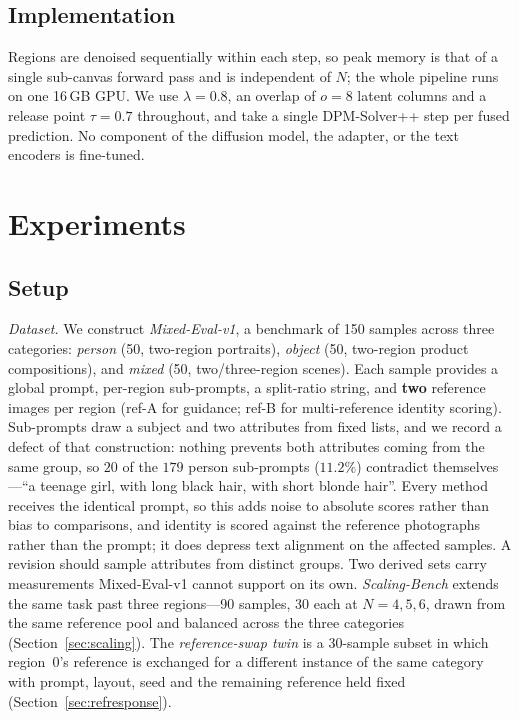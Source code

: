\documentclass[10pt,twocolumn,letterpaper]{article}
\begin{document}
\subsection{Implementation}
\label{sec:method_impl}

Regions are denoised sequentially within each step, so peak memory is
that of a single sub-canvas forward pass and is independent of $N$;
the whole pipeline runs on one 16\,GB GPU.  We use $\lambda=0.8$, an
overlap of $o=8$ latent columns and a release point $\tau=0.7$
throughout, and take a single DPM-Solver++ step per fused prediction.
No component of the diffusion model, the adapter, or the text encoders
is fine-tuned.

\section{Experiments}
\label{sec:exp}

\subsection{Setup}

\noindent\textit{Dataset.}
We construct \emph{Mixed-Eval-v1}, a benchmark of 150 samples across
three categories: \emph{person} (50, two-region portraits),
\emph{object} (50, two-region product compositions), and \emph{mixed}
(50, two/three-region scenes).  Each sample provides a global prompt,
per-region sub-prompts, a split-ratio string, and \textbf{two}
reference images per region (ref-A for guidance; ref-B for
multi-reference identity scoring).
Sub-prompts draw a subject and two attributes from fixed lists, and we record
a defect of that construction: nothing prevents both attributes coming from
the same group, so $20$ of the $179$ person sub-prompts ($11.2\%$) contradict
themselves---``a teenage girl, with long black hair, with short blonde hair''.
Every method receives the identical prompt, so this adds noise to absolute
scores rather than bias to comparisons, and identity is scored against the
reference photographs rather than the prompt; it does depress text alignment
on the affected samples.  A revision should sample attributes from distinct
groups.
Two derived sets carry measurements Mixed-Eval-v1 cannot support on its own.
\emph{Scaling-Bench} extends the same task past three regions---90 samples,
30 each at $N{=}4,5,6$, drawn from the same reference pool and balanced
across the three categories (Section~\ref{sec:scaling}).  The
\emph{reference-swap twin} is a 30-sample subset in which region~0's
reference is exchanged for a different instance of the same category with
prompt, layout, seed and the remaining reference held fixed
(Section~\ref{sec:refresponse}).
\end{document}
